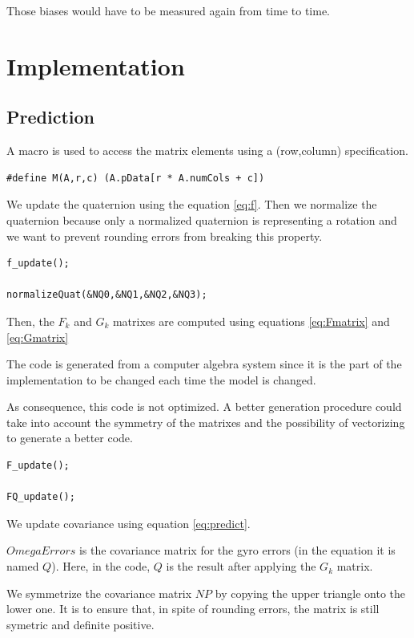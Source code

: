 \documentclass[titlepage,a4,12pt]{article}
\numberwithin{equation}{subsection}
\begin{document}
Those biases would have to be measured again from time to time.

\section{Implementation}
\subsection{Prediction}

A macro is used to access the matrix elements using a (row,column) specification.

\begin{verbatim}
#define M(A,r,c) (A.pData[r * A.numCols + c])
\end{verbatim}

We update the quaternion using the equation \ref{eq:f}.
Then we normalize the quaternion because only a normalized quaternion is representing a rotation and we want to prevent rounding errors from breaking this property.

\begin{verbatim}
f_update();

normalizeQuat(&NQ0,&NQ1,&NQ2,&NQ3);
\end{verbatim}

Then, the $F_k$ and $G_k$ matrixes are computed using equations \ref{eq:Fmatrix}
and \ref{eq:Gmatrix}

The code is generated from a computer algebra system since it is the part of the implementation to be changed each time the model is changed.

As consequence, this code is not optimized. A better generation procedure could take into account the symmetry of the matrixes and the possibility of vectorizing to generate a better code.

\begin{verbatim}
F_update();

FQ_update();
\end{verbatim}

We update covariance using equation \ref{eq:predict}.

$OmegaErrors$ is the covariance matrix for the gyro errors (in the equation it is named $Q$). Here, in the code, $Q$ is the result after applying the $G_k$ matrix.

We symmetrize the covariance matrix $NP$ by copying the upper triangle onto the lower one. It is to ensure that, in spite of rounding errors, the matrix is still symetric and definite positive.
\end{document}
